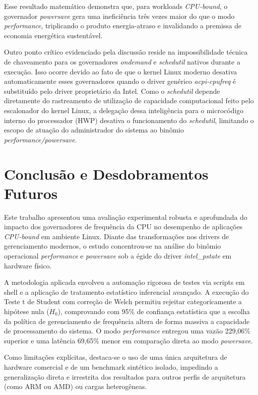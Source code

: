 \documentclass[12pt]{article}
\begin{document}
Esse resultado matemático demonstra que, para workloads \textit{CPU-bound}, o governador \textit{powersave} gera uma ineficiência três vezes maior do que o modo \textit{performance}, triplicando o produto energia-atraso e invalidando a premissa de economia energética sustentável.

Outro ponto crítico evidenciado pela discussão reside na impossibilidade técnica de chaveamento para os governadores \textit{ondemand} e \textit{schedutil} nativos durante a execução. Isso ocorre devido ao fato de que o kernel Linux moderno desativa automaticamente esses governadores quando o driver genérico \textit{acpi-cpufreq} é substituído pelo driver proprietário da Intel. Como o \textit{schedutil} depende diretamente do rastreamento de utilização de capacidade computacional feito pelo escalonador do kernel Linux, a delegação dessa inteligência para o microcódigo interno do processador (HWP) desativa o funcionamento do \textit{schedutil}, limitando o escopo de atuação do administrador do sistema ao binômio \textit{performance/powersave}.


\section{Conclusão e Desdobramentos Futuros}

Este trabalho apresentou uma avaliação experimental robusta e aprofundada do impacto dos governadores de frequência da CPU no desempenho de aplicações \textit{CPU-bound} em ambiente Linux. Diante das transformações nos drivers de gerenciamento modernos, o estudo concentrou-se na análise do binômio operacional \textit{performance} e \textit{powersave} sob a égide do driver \textit{intel\_pstate} em hardware físico.

A metodologia aplicada envolveu a automação rigorosa de testes via scripts em shell e a aplicação de tratamento estatístico inferencial avançado. A execução do Teste t de Student com correção de Welch permitiu rejeitar categoricamente a hipótese nula ($H_0$), comprovando com 95\% de confiança estatística que a escolha da política de gerenciamento de frequência altera de forma massiva a capacidade de processamento do sistema. O modo \textit{performance} entregou uma vazão 229,06\% superior e uma latência 69,65\% menor em comparação direta ao modo \textit{powersave}.

Como limitações explícitas, destaca-se o uso de uma única arquitetura de hardware comercial e de um benchmark sintético isolado, impedindo a generalização direta e irrestrita dos resultados para outros perfis de arquitetura (como ARM ou AMD) ou cargas heterogêneas. 
\end{document}
